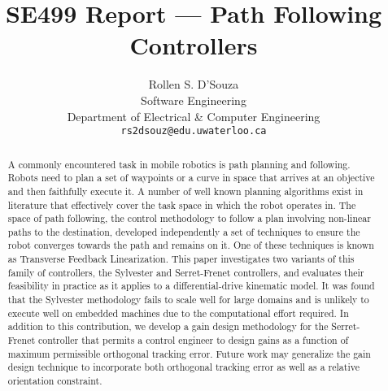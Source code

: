 \documentclass[11pt]{article}
\author{{Rollen S. D'Souza}\\
        {Software Engineering}\\
        {Department of Electrical \& Computer Engineering}\\
        {\texttt{rs2dsouz@edu.uwaterloo.ca}}}
\title{\textbf{SE499 Report --- Path Following Controllers}}
\date{}
\begin{document}
\maketitle
\begin{abstract}
A commonly encountered task in mobile robotics is path planning and following. Robots need to plan a set of waypoints or a curve in space that arrives at an objective and then faithfully execute it. A number of well known planning algorithms exist in literature that effectively cover the task space in which the robot operates in. The space of path following, the control methodology to follow a plan involving non-linear paths to the destination, developed independently a set of techniques to ensure the robot converges towards the path and remains on it. One of these techniques is known as Transverse Feedback Linearization. This paper investigates two variants of this family of controllers, the Sylvester and Serret-Frenet controllers, and evaluates their feasibility in practice as it applies to a differential-drive kinematic model. It was found that the Sylvester methodology fails to scale well for large domains and is unlikely to execute well on embedded machines due to the computational effort required. In addition to this contribution, we develop a gain design methodology for the Serret-Frenet controller that permits a control engineer to design gains as a function of maximum permissible orthogonal tracking error. Future work may generalize the gain design technique to incorporate both orthogonal tracking error as well as a relative orientation constraint.
\end{abstract}
\end{document}
